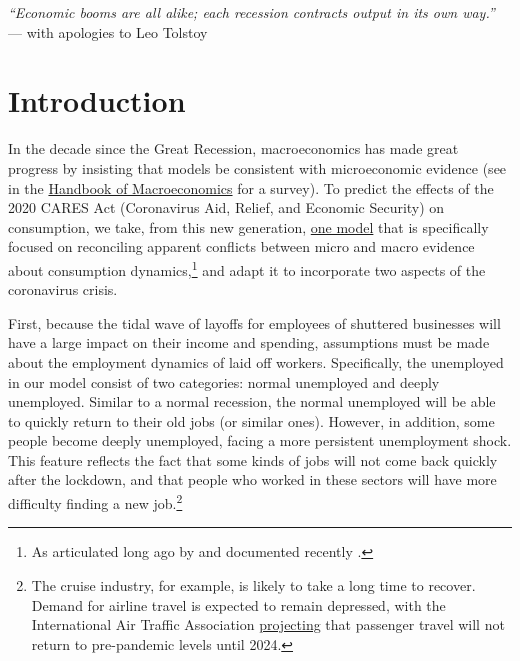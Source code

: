 \documentclass[titlepage,a4paper]{\econtex}
\begin{document}

\noindent \textit{\large ``Economic booms are all alike; each recession contracts output in its own way.''} --- with apologies to Leo Tolstoy

\section{Introduction}

In the decade since the Great Recession, macroeconomics has made great progress by insisting that models be consistent with microeconomic evidence (see \cite{kmpHandbook} in the \href{https://www.sciencedirect.com/handbook/handbook-of-macroeconomics}{Handbook of Macroeconomics} for a survey).  To predict the effects of the 2020 CARES Act (Coronavirus Aid, Relief, and Economic Security) on consumption, we take, from this new generation, \href{https://econ.jhu.edu/people/ccarroll/papers/cAndCwithSTickyE}{one model} that is specifically focused on reconciling apparent conflicts between micro and macro evidence about consumption dynamics,\footnote{As articulated long ago by \cite{deatonUnderstandingC} and documented recently \cite{hrsHabit}.} and adapt it to incorporate two aspects of the coronavirus crisis.

First, because the tidal wave of layoffs for employees of shuttered businesses will have a large impact on their income and spending, assumptions must be made about the employment dynamics of laid off workers. Specifically, the unemployed in our model consist of two categories: normal unemployed and deeply unemployed. Similar to a normal recession, the normal unemployed will be able to quickly return to their old jobs (or similar ones). However, in addition, some people become deeply unemployed, facing a more persistent unemployment shock. This feature reflects the fact that some kinds of jobs will not come back quickly after the lockdown, and that people who worked in these sectors will have more difficulty finding a new job.\footnote{The cruise industry, for example, is likely to take a long time to recover. Demand for airline travel is expected to remain depressed, with the International Air Traffic Association \href{https://www.iata.org/en/pressroom/pr/2020-07-28-02/}{projecting} that passenger travel will not return to pre-pandemic levels until 2024.}
\end{document}

